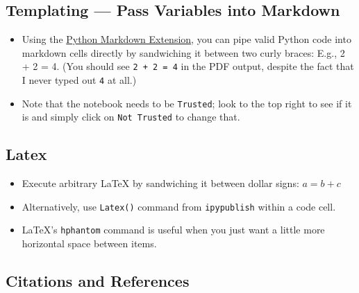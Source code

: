 \documentclass[10pt,parskip=half,
	toc=sectionentrywithdots,
	bibliography=totocnumbered,
	captions=tableheading,
    numbers=noendperiod,
    headings=standardclasses]{scrartcl}
\providecommand{\tightlist}{%
  \setlength{\itemsep}{0pt}\setlength{\parskip}{0pt}}
\begin{document}

\subsection{Templating --- Pass Variables into
Markdown}\label{templating-pass-variables-into-markdown}

\begin{itemize}
\tightlist
\item
  Using the
  \href{https://jupyter-contrib-nbextensions.readthedocs.io/en/latest/nbextensions/python-markdown/readme.html}{Python
  Markdown Extension}, you can pipe valid Python code into markdown
  cells directly by sandwiching it between two curly braces: E.g., 2 + 2
  = 4. (You should see \texttt{2\ +\ 2\ =\ 4} in the PDF output, despite
  the fact that I never typed out \texttt{4} at all.)
\item
  Note that the notebook needs to be \texttt{Trusted}; look to the top
  right to see if it is and simply click on \texttt{Not\ Trusted} to
  change that.
\end{itemize}

\subsection{Latex}\label{latex}

\begin{itemize}
\tightlist
\item
  Execute arbitrary \LaTeX \hphantom{} by sandwiching it between dollar
  signs: \(a = b+c\)
\item
  Alternatively, use \texttt{Latex()} command from \texttt{ipypublish}
  within a code cell.
\item
  \LaTeX's \texttt{hphantom} command is useful when you just want a
  little more horizontal space between items.
\end{itemize}

\subsection{Citations and References}\label{citations-and-references}
\end{document}
